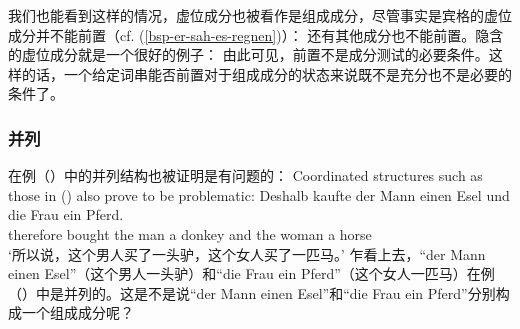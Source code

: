 我们也能看到这样的情况，虚位成分也被看作是组成成分，尽管事实是宾格的虚位成分并不能前置（cf. (\ref{bsp-er-sah-es-regnen})）：
\eal
{}
\zl
还有其他成分也不能前置。隐含的虚位成分就是一个很好的例子：
\eal
{}
\zl
由此可见，前置不是成分测试的必要条件。这样的话，一个给定词串能否前置对于组成成分的状态来说既不是充分也不是必要的条件了。

\subsubsection{并列}
\label{Abschnitt-K-Tests-Koordination}
在例（）中的并列结构也被证明是有问题的：
Coordinated structures such as those in () also prove to be problematic:
\ea
\label{ex-gapping}
\gll Deshalb kaufte der Mann einen Esel und die Frau ein Pferd.\\
	 therefore bought the man a donkey and the woman a horse\\
\glt `所以说，这个男人买了一头驴，这个女人买了一匹马。'
\z
乍看上去，“der Mann einen Esel”（这个男人一头驴）和“die Frau ein Pferd”（这个女人一匹马）在例（）中是并列的。这是不是说“der Mann einen Esel”和“die Frau ein Pferd”分别构成一个组成成分呢？

